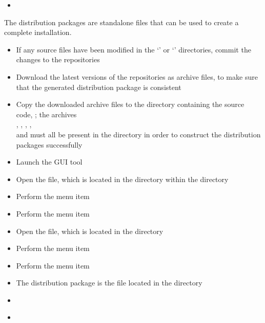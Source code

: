 \tertiaryEnd
{}
\begin{itemize}
\item\TBD
\end{itemize}
\tertiaryEnd
\secondaryEnd
{}
The distribution packages are standalone files that can be used to create a complete
\mplusm{} installation.
\begin{itemize}
\item If any source files have been modified in the `' or
`' directories, commit the changes to the
 repositories
\item\exSp{} Download the latest versions of the  repositories as 
archive files, to make sure that the generated distribution package is consistent
\item\exSp{} Copy the downloaded  archive files to the directory containing
the \mplusm{} source code, ; the archives\\
, ,
, ,\\
 and  must
all be present in the  directory in order to construct the distribution
packages successfully
\item\exSp{} Launch the  GUI tool
\item\exSp{} Open the  file, which is located in the
 directory within the  directory
\item\exSp{} Perform the menu item 
\item\exSp{} Perform the menu item 
\item\exSp{} Open the  file, which is located in the
 directory
\item\exSp{} Perform the menu item 
\item\exSp{} Perform the menu item 
\item\exSp{} The distribution package is the  file located in the
 directory
\end{itemize}
\tertiaryEnd
{}
\begin{itemize}
\item\TBD
\end{itemize}
\tertiaryEnd
{}
\begin{itemize}
\item\TBD
\end{itemize}
\tertiaryEnd
\secondaryEnd
\appendixEnd{}
